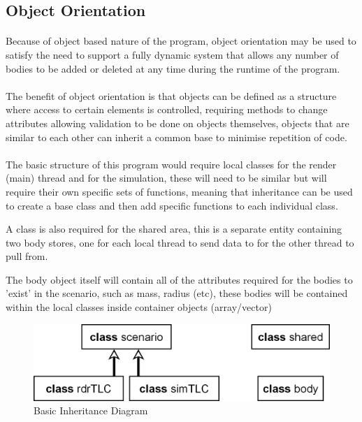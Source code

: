 \subsection{Object Orientation}
\paragraph{}
Because of object based nature of the program, object orientation may be used to satisfy the need to support a fully dynamic system that allows any number of bodies to be added or deleted at any time during the runtime of the program.

\paragraph{}
The benefit of object orientation is that objects can be defined as a structure where access to certain elements is controlled, requiring methods to change attributes allowing validation to be done on objects themselves, objects that are similar to each other can inherit a common base to minimise repetition of code.

\paragraph{}
The basic structure of this program would require local classes for the render (main) thread and for the simulation, these will need to be similar but will require their own specific sets of functions, meaning that inheritance can be used to create a base class and then add specific functions to each individual class.

A class is also required for the shared area, this is a separate entity containing two body stores, one for each local thread to send data to for the other thread to pull from.

The body object itself will contain all of the attributes required for the bodies to 'exist' in the scenario, such as mass, radius (etc), these bodies will be contained within the local classes inside container objects (array/vector)

\begin{figure}[H]
  \centering
  \includegraphics[width=\textwidth]{img/aid.png}
  \caption{Basic Inheritance Diagram}
\end{figure}

